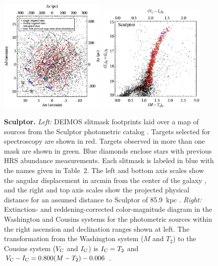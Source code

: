\documentclass{emulateapj}
\begin{document}
\begin{figure}[hp!]
\centering
\includegraphics[width=0.46\textwidth]{scl_coords_targets.eps}
\hfil
\includegraphics[width=0.46\textwidth]{scl_cmd_targets.eps}
\caption{{\bf Sculptor.}  {\it Left:} DEIMOS slitmask footprints laid
  over a map of sources from the Sculptor photometric catalog
  \citep{wes06}.  Targets selected for spectroscopy are shown in red.
  Targets observed in more than one mask are shown in green.  Blue
  diamonds enclose stars with previous HRS abundance measurements.
  Each slitmask is labeled in blue with the names given in Table~2.
  The left and bottom axis scales show the angular displacement in
  arcmin from the center of the galaxy \citep[$\alpha_0 =
    1^{\rm{h}}00^{\rm{m}}09^{\rm{s}}$, $\delta_0 = -33^{\circ}42
    \farcm 5$,][]{mat98}, and the right and top axis scales show the
  projected physical distance for an assumed distance to Sculptor of
  85.9~kpc \citep{pie08}.  {\it Right:} Extinction- and
  reddening-corrected color-magnitude diagram in the Washington and
  Cousins systems for the photometric sources within the right
  ascension and declination ranges shown at left.  The transformation
  from the Washington system ($M$ and $T_2$) to the Cousins system
  ($V_{\rm C}$ and $I_{\rm C}$) is $I_{\rm C} = T_2$ and $V_{\rm C} -
  I_{\rm C} = 0.800(M-T_2) - 0.006$ \citep{maj00}.}
\end{figure}
\end{document}
